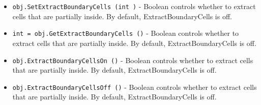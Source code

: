 \begin{itemize}
\item  \verb|obj.SetExtractBoundaryCells (int )| -  Boolean controls whether to extract cells that are partially inside.
 By default, ExtractBoundaryCells is off.

\item  \verb|int = obj.GetExtractBoundaryCells ()| -  Boolean controls whether to extract cells that are partially inside.
 By default, ExtractBoundaryCells is off.

\item  \verb|obj.ExtractBoundaryCellsOn ()| -  Boolean controls whether to extract cells that are partially inside.
 By default, ExtractBoundaryCells is off.

\item  \verb|obj.ExtractBoundaryCellsOff ()| -  Boolean controls whether to extract cells that are partially inside.
 By default, ExtractBoundaryCells is off.

\end{itemize}

